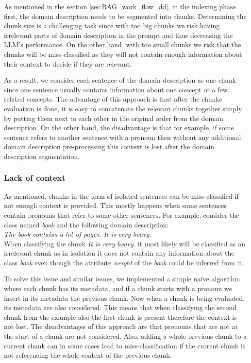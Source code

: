 As mentioned in the section \ref{sec:RAG_work_flow_dd}, in the indexing phase first, the domain description needs to be segmented into chunks. Determining the chunk size is a challenging task since with too big chunks we risk having irrelevant parts of domain description in the prompt and thus decreasing the LLM's performance. On the other hand, with too small chunks we risk that the chunks will be miss-classified as they will not contain enough information about their context to decide if they are relevant.

As a result, we consider each sentence of the domain description as one chunk since one sentence usually contains information about one concept or a few related concepts. The advantage of this approach is that after the chunks evaluation is done, it is easy to concatenate the relevant chunks together simply by putting them next to each other in the original order from the domain description. On the other hand, the disadvantage is that for example, if some sentence refers to another sentence with a pronoun then without any additional domain description pre-processing this context is lost after the domain description segmentation.


\subsubsection{Lack of context}

As mentioned, chunks in the form of isolated sentences can be miss-classified if not enough context is provided. This mostly happens when some sentences contain pronouns that refer to some other sentences. For example, consider the class named \textit{book} and the following domain description: \\

\noindent{}\textit{The book contains a lot of pages. It is very heavy.} \\

\noindent{}When classifying the chunk \textit{It is very heavy.} it most likely will be classified as an irrelevant chunk as in isolation it does not contain any information about the class \textit{book} even though the attribute \textit{weight} of the \textit{book} could be inferred from it.

To solve this issue and similar issues, we implemented a simple naive algorithm where each chunk has its metadata, and if a chunk starts with a pronoun we insert in its metadata the previous chunk. Now when a chunk is being evaluated, its metadata are also considered. This means that when classifying the second chunk from the example also the first chunk is present therefore the context is not lost. The disadvantages of this approach are that pronouns that are not at the start of a chunk are not considered. Also, adding a whole previous chunk to a current chunk can in some cases lead to miss-classification if the current chunk is not referencing the whole context of the previous chunk.


